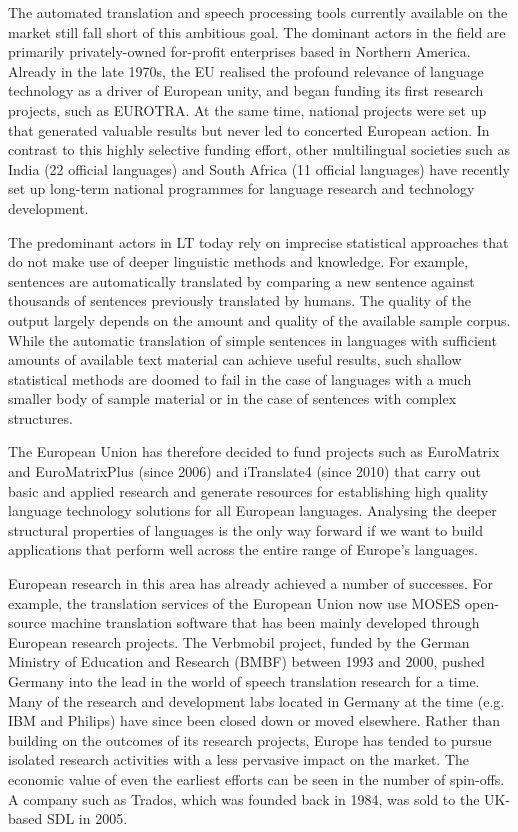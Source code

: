 \documentclass[]{../../metanetpaper}
\begin{document}
\begin{Parallel}[c]{80mm}{80mm}
{    The automated translation and speech processing tools currently available on the market still fall short of this ambitious goal. The dominant actors in the field are primarily privately-owned for-profit enterprises based in Northern America. Already in the late 1970s, the EU realised the profound relevance of language technology as a driver of European unity, and began funding its first research projects, such as EUROTRA. At the same time, national projects were set up that generated valuable results but never led to concerted European action. In contrast to this highly selective funding effort, other multilingual societies such as India (22 official languages) and South Africa (11 official languages) have recently set up long-term national programmes for language research and technology development. 
    

    The predominant actors in LT today rely on imprecise statistical approaches that do not make use of deeper linguistic methods and knowledge. For example, sentences are automatically translated by comparing a new sentence against thousands of sentences previously translated by humans. The quality of the output largely depends on the amount and quality of the available sample corpus. While the automatic translation of simple sentences in languages with sufficient amounts of available text material can achieve useful results, such shallow statistical methods are doomed to fail in the case of languages with a much smaller body of sample material or in the case of sentences with complex structures.

    The European Union has therefore decided to fund projects such as EuroMatrix and EuroMatrixPlus (since 2006) and iTranslate4 (since 2010) that carry out basic and applied research and generate resources for establishing high quality language technology solutions for all European languages. Analysing the deeper structural properties of languages is the only way forward if we want to build applications that perform well across the entire range of Europe’s languages.

    European research in this area has already achieved a number of successes. For example, the translation services of the European Union now use MOSES open-source machine translation software that has been mainly developed through European research projects. The Verbmobil project, funded by the German Ministry of Education and Research (BMBF) between 1993 and 2000, pushed Germany into the lead in the world of speech translation research for a time. Many of the research and development labs located in Germany at the time (e.g. IBM and Philips) have since been closed down or moved elsewhere. Rather than building on the outcomes of its research projects, Europe has tended to pursue isolated research activities with a less pervasive impact on the market. The economic value of even the earliest efforts can be seen in the number of spin-offs. A company such as Trados, which was founded back in 1984, was sold to the UK-based SDL in 2005.

}
\end{Parallel}
\end{document}
